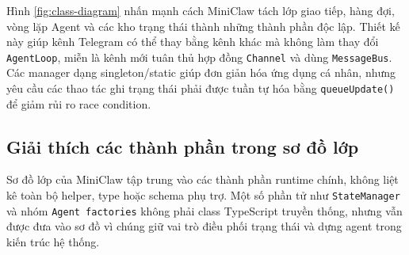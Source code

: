 Hình \ref{fig:class-diagram} nhấn mạnh cách MiniClaw tách lớp giao tiếp, hàng đợi, vòng lặp Agent và các kho trạng thái thành những thành phần độc lập. Thiết kế này giúp kênh Telegram có thể thay bằng kênh khác mà không làm thay đổi \texttt{AgentLoop}, miễn là kênh mới tuân thủ hợp đồng \texttt{Channel} và dùng \texttt{MessageBus}. Các manager dạng singleton/static giúp đơn giản hóa ứng dụng cá nhân, nhưng yêu cầu các thao tác ghi trạng thái phải được tuần tự hóa bằng \texttt{queueUpdate()} để giảm rủi ro race condition.

\subsection{Giải thích các thành phần trong sơ đồ lớp}
Sơ đồ lớp của MiniClaw tập trung vào các thành phần runtime chính, không liệt kê toàn bộ helper, type hoặc schema phụ trợ. Một số phần tử như \texttt{StateManager} và nhóm \texttt{Agent factories} không phải class TypeScript truyền thống, nhưng vẫn được đưa vào sơ đồ vì chúng giữ vai trò điều phối trạng thái và dựng agent trong kiến trúc hệ thống.

\begingroup
\scriptsize
\setlength{\tabcolsep}{3pt}
\renewcommand{\arraystretch}{1.2}

